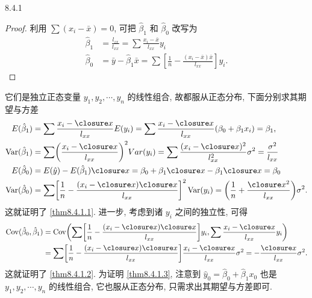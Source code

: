 \begin{theorem}{}{8.4.1}
\begin{proof}
利用 $\sum(x_i-\bar{x}) = 0$, 可把 $\hat{\beta}_{1}$ 和 $\hat{\beta}_{0}$ 改写为
  \begin{equation*}
    \begin{split}
      \hat{\beta}_{1} & = \frac{l_{zx}}{l_{xx}} =\sum \frac{x_{i} - \bar{x}}{l_{xx}} y_{i} \\
      \hat{\beta}_{0} & = \bar{y} - \hat{\beta}_{1} \bar{x} =\sum\left[\frac{1}{n} - \frac{(x_{i} - \bar{x}) \bar{x}}{l_{xx}}\right] y_{i}.
    \end{split}
  \end{equation*}
\end{proof}
它们是独立正态变量 $y_1,y_2, \cdots, y_n$ 的线性组合, 故都服从正态分布, 下面分别求其期望与方差
\begin{equation*}
\begin{split}
E(\hat{\beta}_{1}) & =\sum \frac{x_{i} - \bar{x}}{l_{xx}} E(y_{i}) =\sum \frac{x_{i} - \bar{x}}{l_{xx}}(\beta_{0} + \beta_{1} x_{i}) = \beta_{1}, \\
\Var(\hat{\beta}_{1}) & =\sum\left(\frac{x_{i} - \bar{x}}{l_{xx}} \right)^{2}  Var(y_{i}) =\sum \frac{(x_{i}-\bar{x})^{2}}{l_{xx}^{2}}\sigma^2 = \frac{\sigma^{2}}{l_{xx}} \\
E(\hat{\beta}_{0}) & = E(\hat{y}) - E(\hat{\beta}_{1}) \bar{x} = \beta_{0} + \beta_{1} \bar{x} - \beta_{1} \bar{x} = \beta_{0} \\
\Var(\hat{\beta}_{0}) & =\sum\left[\frac{1}{n} - \frac{(x_{i} - \bar{x}) \bar{x}}{l_{xx}}\right]^{2} \Var(y_{i}) = \left(\frac{1}{n} + \frac{\bar{x}^{2}}{l_{xx}}\right)\sigma^{2}.
\end{split}
\end{equation*}
这就证明了 \ref{thm8.4.1.1}. 进一步, 考虑到诸 $y_i$ 之间的独立性, 可得
\begin{equation*}
\begin{aligned}
\Cov(\hat{\beta}_{0}, \hat{\beta}_{1}) & = \Cov\left(\sum \left[\frac{1}{n}-\frac{(x_{i}-\bar{x})\bar{x}}{l_{x x}} \right] y_{i},\sum \frac{x_{i} -\bar{x}}{l_{xx}} y_{i}\right) \\
 & =\sum\left[\frac{1}{n}-\frac{(x_{i}-\bar{x}) \bar{x}}{l_{xx}}\right] \frac{x_{i}-\bar{x}}{l_{xx}}\sigma^{2} = - \frac{\bar{x}}{l_{xx}}\sigma^{2}.
\end{aligned}
\end{equation*}
这就证明了 \ref{thm8.4.1.2}. 为证明 \ref{thm8.4.1.3}, 注意到 $\hat{y}_0 = \hat{\beta}_0 + \hat{\beta}_1 x_0$ 也是 $y_1, y_2, \cdots, y_n$ 的线性组合, 它也服从正态分布, 只需求出其期望与方差即可.

\end{theorem}
